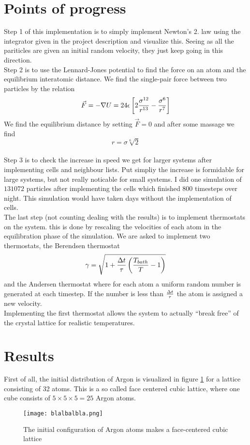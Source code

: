 \documentclass[a4paper,english, 10pt, twoside]{article}
\begin{document}
\section{Points of progress}
Step 1 of this implementation is to simply implement Newton's 2. law using the integrator 
given in the project description and visualize this. Seeing as all the pariticles are given 
an initial random velocity, they just keep going in this direction.\\
Step 2 is to use the Lennard-Jones potential to find the force on an atom and the equilibrium 
interatomic distance. We find the single-pair force between two particles by the relation 
$$
\vec{F} = -\nabla U = 24\epsilon\left[2{\sigma^{12}\over r^{13}} - {\sigma^6\over r^7}\right]
$$
We find the equilibrium distance by setting $\vec{F} = 0$ and after some massage we find 
$$
r = \sigma\sqrt[6]{2}
$$\\
Step 3 is to check the increase in speed we get for larger systems after implementing cells 
and neighbour lists. Put simpliy the increase is formidable for large systems, but not really 
noticable for small systems. I did one simulation of $131072$ particles after implementing 
the cells which finished 800 timesteps over night. This simulation would have taken days 
without the implementation of cells.\\
The last step (not counting dealing with the results) is to implement thermostats on the system. 
this is done by rescaling the velocities of each atom in the equilibration phase of the simulation. 
We are asked to implement two thermostats, the Berendsen thermostat 
$$
\gamma = \sqrt{1+{\Delta t\over\tau}\left({T_{bath}\over T}-1\right)}
$$
and the Andersen thermostat where for each atom a uniform random number is generated at each timestep. 
If the number is less than ${\Delta t\over \tau}$ the atom is assigned a new velocity.\\
Implementing the first thermostat allows the system to actually ``break free'' of the crystal lattice 
for realistic temperatures.

\section{Results}
First of all, the initial distribution of Argon is visualized in figure \ref{first} for a lattice 
consisting of 32 atoms. This 
is a so called face centered cubic lattice, where one cube consists of $5\times5\times5 = 25$ 
Argon atoms.
\begin{figure}[H]
\centering
\texttt{[image: blalbalbla.png]}
\caption{The initial configuration of Argon atoms makes a face-centered cubic lattice }
\label{first}
\end{figure} 
\end{document}
